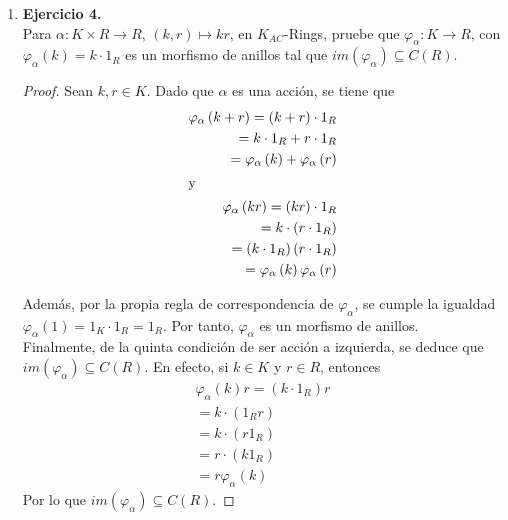 \documentclass{article}
\newcommand{\lrprth}[1]{
    \left(#1\right)
}
\newcommand{\ringcenter}[1]{
    C\lrprth{#1}
}
\theoremstyle{definition}
\theoremstyle{plain}
\theoremstyle{plain}
\theoremstyle{definition}
\theoremstyle{definition}
\theoremstyle{definition}
\theoremstyle{definition}
\theoremstyle{definition}
\theoremstyle{definition}
\begin{document}
\begin{enumerate}
\item \textbf{Ejercicio 4.}\\
Para $\alpha : K \times R \longrightarrow R$, $\lrprth{k,r} \mapsto kr$, en $K_{AC}$-Rings, pruebe que $\varphi_{\alpha} : K \longrightarrow R$, con $\varphi_{\alpha}\lrprth{k}=k \cdot 1_{R}$ es un morfismo de anillos tal que $im\lrprth{\varphi_{\alpha}}\subseteq \ringcenter{R}$.
\begin{proof}
Sean $k,r \in K$. Dado que $\alpha$ es una acción, se tiene que
\begin{align*}
\varphi_{\alpha}\lrprth{k+r}=\lrprth{k+r}\cdot 1_{R}\\
=k \cdot 1_{R} + r \cdot 1_{R}\\
=\varphi_{\alpha}\lrprth{k}+\varphi_{\alpha}\lrprth{r}\\
\intertext{y}
\varphi_{\alpha}\lrprth{kr}=\lrprth{kr}\cdot 1_{R}\\
=k \cdot\lrprth{r \cdot 1_{R}}\\
=\lrprth{k \cdot 1_{R}}\lrprth{r \cdot 1_{R}}\\
=\varphi_{\alpha}\lrprth{k}\varphi_{\alpha}\lrprth{r}
\end{align*}

Además, por la propia regla de correspondencia de $\varphi_{\alpha}$, se cumple la igualdad $\varphi_{\alpha}\lrprth{1}=1_{K} \cdot 1_{R} = 1_{R}$. Por tanto, $\varphi_{\alpha}$ es un morfismo de anillos.\\

Finalmente, de la quinta condición de ser acción a izquierda, se deduce que $im\lrprth{\varphi_{\alpha}}\subseteq\ringcenter{R}$. En efecto, si $k \in K$ y $r \in R$, entonces
\begin{align*}
\varphi_{\alpha}\lrprth{k}r=\lrprth{k \cdot 1_{R}}r\\
=k \cdot\lrprth{1_{R}r}\\
=k \cdot\lrprth{r1_{R}}\\
=r \cdot\lrprth{k1_{R}}\\
=r\varphi_{\alpha}\lrprth{k}
\end{align*}
Por lo que $im\lrprth{\varphi_{\alpha}}\subseteq \ringcenter{R}$.
\end{proof}


\end{enumerate}
\end{document}
